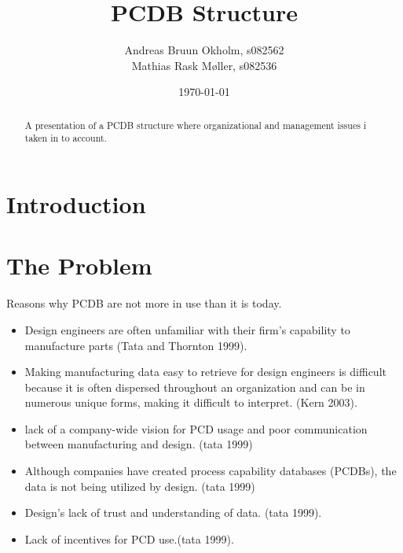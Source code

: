 \documentclass[aip,amsmath,reprint, author-year]{revtex4-1}
\begin{document}
\begin{abstract}
A presentation of a PCDB structure where organizational and management issues i taken in to account.
\end{abstract}

\title{PCDB Structure}
\author{Andreas Bruun Okholm, s082562\\
Mathias Rask Møller, s082536 }  
 
\date{\today}
\maketitle


\section{Introduction}


\section{The Problem}

Reasons why PCDB are not more in use than it is today.

\begin{itemize}

\item{Design engineers are often unfamiliar with their firm’s capability to manufacture parts (Tata and Thornton 1999).}
\item{Making manufacturing data easy to retrieve for design engineers is difficult because it is often dispersed throughout an organization and can be in numerous unique forms, making it difficult to interpret. (Kern 2003).}
\item{lack of a company-wide vision for PCD usage and poor communication between manufacturing and design. (tata 1999)}
\item{Although companies have created process capability databases (PCDBs), the data is not being utilized by design. (tata 1999)}
\item{Design’s lack of trust and understanding of data. (tata 1999).}
\item{Lack of incentives for PCD use.(tata 1999).}



\end{itemize} 
\end{document}
